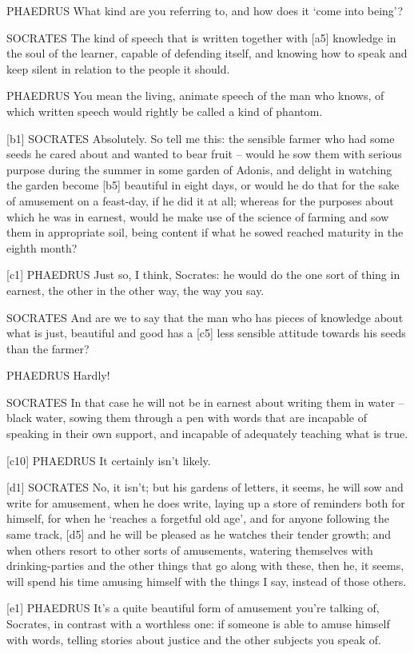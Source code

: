 PHAEDRUS What kind are you referring to, and how does it ‘come into
being'?

SOCRATES The kind of speech that is written together with {[}a5{]}
knowledge in the soul of the learner, capable of defending itself, and
knowing how to speak and keep silent in relation to the people it
should.

PHAEDRUS You mean the living,
animate speech of the
man who knows, of which written speech would rightly be called a kind of
phantom.

{[}b1{]} SOCRATES Absolutely. So tell me this: the sensible farmer who
had some seeds he cared about and wanted to bear fruit -- would he sow
them with serious purpose during the summer in some garden of
Adonis, and delight in
watching the garden become {[}b5{]} beautiful in eight days, or would he
do that for the sake of amusement on a feast-day, if he did it at all;
whereas for the purposes about which he was in earnest, would he make
use of the science of farming and sow them in appropriate soil, being
content if what he sowed reached maturity in the eighth month?

{[}c1{]} PHAEDRUS Just so, I think, Socrates: he would do the one sort
of thing in earnest, the other in the other way, the way you say.

SOCRATES And are we to say that the man who has pieces of
knowledge about what is
just, beautiful and good
has a {[}c5{]} less sensible attitude towards his seeds than the farmer?

PHAEDRUS Hardly!

SOCRATES In that case he will not be in earnest about writing them in
water -- black water, sowing them through a pen with words that are
incapable of speaking in their own support, and incapable of adequately
teaching what is true.

{[}c10{]} PHAEDRUS It certainly isn't likely.

{[}d1{]} SOCRATES No, it isn't; but his gardens of letters, it seems, he
will sow and write for amusement, when he does write, laying up a store
of reminders both for himself, for when he ‘reaches a forgetful old
age', and for anyone
following the same track, {[}d5{]} and he will be pleased as he watches
their tender growth; and when others resort to other sorts of
amusements, watering themselves with drinking-parties and the other
things that go along with these, then he, it seems, will spend his time
amusing himself with the things I say, instead of those others.

{[}e1{]} PHAEDRUS It's a quite beautiful form of amusement you're
talking of, Socrates, in contrast with a worthless one: if someone is
able to amuse himself with words, telling stories about justice and the
other subjects you speak
of.

